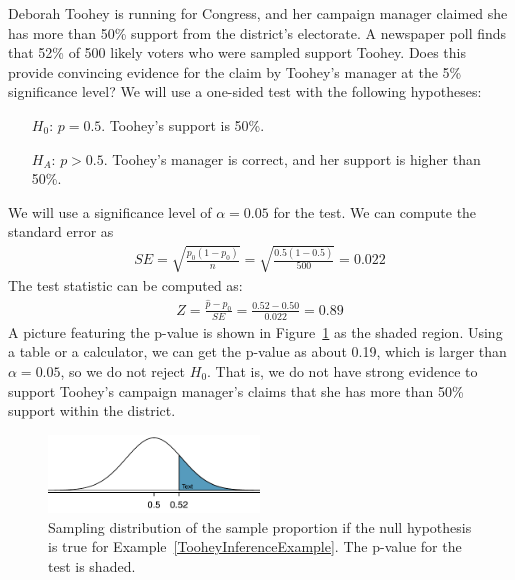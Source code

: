 \begin{example}{Deborah Toohey is running for Congress, and her campaign manager claimed she has more than 50\% support from the district's electorate. A newspaper poll finds that 52\% of 500 likely voters who were sampled support Toohey. Does this provide convincing evidence for the claim by Toohey's manager at the 5\% significance level?}\label{TooheyInferenceExample}
We will use a one-sided test with the following hypotheses:
\begin{itemize}
\item[$H_0$:] $p = 0.5$. Toohey's support is 50\%.
\item[$H_A$:] $p > 0.5$. Toohey's manager is correct, and her support is higher than 50\%.
\end{itemize}
We will use a significance level of $\alpha = 0.05$ for the test. We can compute the standard error as
\begin{align*}
SE = \sqrt{\frac{p_0 (1 - p_0)}{n}} = \sqrt{\frac{0.5 (1 - 0.5)}{500}} = 0.022
\end{align*}
The test statistic can be computed as:
\begin{align*}
Z = \frac{\hat{p} - p_0}{SE} = \frac{0.52 - 0.50}{0.022} = 0.89
\end{align*}
A picture featuring the p-value is shown in Figure~\ref{pValueForCampaignManagerClaimOfMoreThan50PercentSupport} as the shaded region. Using a table or a calculator, we can get the p-value as about 0.19, which is larger than $\alpha = 0.05$, so we do not reject $H_0$. That is, we do not have strong evidence to support Toohey's campaign manager's claims that she has more than 50\% support within the district.
\end{example}

\begin{figure}[h]
\centering
\includegraphics[width=0.5\textwidth]{ch_inference_for_props/figures/pValueForCampaignManagerClaimOfMoreThan50PercentSupport/pValueForCampaignManagerClaimOfMoreThan50PercentSupport}
\caption{Sampling distribution of the sample proportion if the null hypothesis is true for Example~\ref{TooheyInferenceExample}. The p-value for the test is shaded.}
\label{pValueForCampaignManagerClaimOfMoreThan50PercentSupport}
\end{figure}

